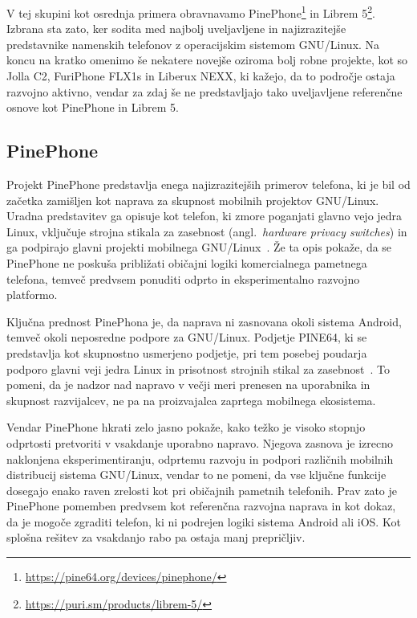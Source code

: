 \documentclass[a4paper,12pt,openright]{book}
\begin{document}
V tej skupini kot osrednja primera obravnavamo PinePhone\footnote{\url{https://pine64.org/devices/pinephone/}} in Librem 5\footnote{\url{https://puri.sm/products/librem-5/}}.
Izbrana sta zato, ker sodita med najbolj uveljavljene in najizrazitejše predstavnike namenskih telefonov z operacijskim sistemom GNU/Linux.
Na koncu na kratko omenimo še nekatere novejše oziroma bolj robne projekte, kot so Jolla C2, FuriPhone FLX1s in Liberux NEXX, ki kažejo, da to področje ostaja razvojno aktivno, vendar za zdaj še ne predstavljajo tako uveljavljene referenčne osnove kot PinePhone in Librem 5.

\subsection{PinePhone}

Projekt PinePhone predstavlja enega najizrazitejših primerov telefona, ki je bil od začetka zamišljen kot naprava za skupnost mobilnih projektov GNU/Linux.
Uradna predstavitev ga opisuje kot telefon, ki zmore poganjati glavno vejo jedra Linux, vključuje strojna stikala za zasebnost (angl.~\textit{hardware privacy switches}) in ga podpirajo glavni projekti mobilnega GNU/Linux~\cite{pine64_pinephone_device,pine64_wiki_pinephone}.
Že ta opis pokaže, da se PinePhone ne poskuša približati običajni logiki komercialnega pametnega telefona, temveč predvsem ponuditi odprto in eksperimentalno razvojno platformo.

Ključna prednost PinePhona je, da naprava ni zasnovana okoli sistema Android, temveč okoli neposredne podpore za GNU/Linux.
Podjetje PINE64, ki se predstavlja kot skupnostno usmerjeno podjetje, pri tem posebej poudarja podporo glavni veji jedra Linux in prisotnost strojnih stikal za zasebnost~\cite{pine64_pinephone_device}.
To pomeni, da je nadzor nad napravo v večji meri prenesen na uporabnika in skupnost razvijalcev, ne pa na proizvajalca zaprtega mobilnega ekosistema.

Vendar PinePhone hkrati zelo jasno pokaže, kako težko je visoko stopnjo odprtosti pretvoriti v vsakdanje uporabno napravo.
Njegova zasnova je izrecno naklonjena eksperimentiranju, odprtemu razvoju in podpori različnih mobilnih distribucij sistema GNU/Linux, vendar to ne pomeni, da vse ključne funkcije dosegajo enako raven zrelosti kot pri običajnih pametnih telefonih.
Prav zato je PinePhone pomemben predvsem kot referenčna razvojna naprava in kot dokaz, da je mogoče zgraditi telefon, ki ni podrejen logiki sistema Android ali iOS.
Kot splošna rešitev za vsakdanjo rabo pa ostaja manj prepričljiv.
\end{document}
